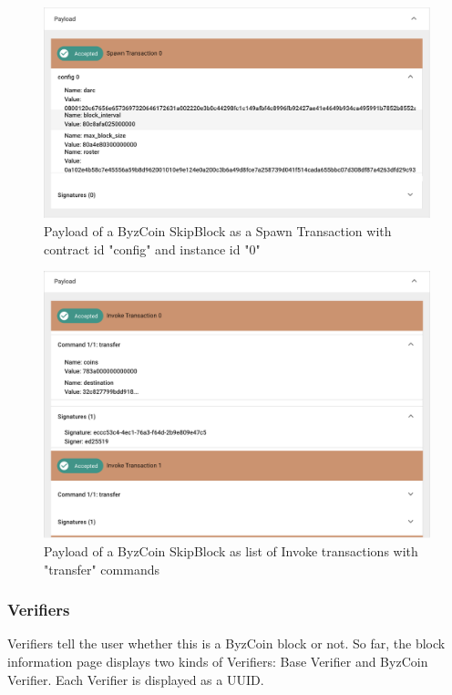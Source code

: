 \documentclass[11pt, a4paper, twoside, openright]{article} %
\begin{document}
{\begin{figure}[h]
    \centering
    \includegraphics[width=\textwidth]{spanw.png}
    \caption{Payload of a ByzCoin SkipBlock as a Spawn Transaction with contract id "config" and instance id "0"}
    \label{fig:Figure6}
\end{figure}
\begin{figure}[h]
    \centering
    \includegraphics[width=\textwidth]{Transactions.png}
    \caption{Payload of a ByzCoin SkipBlock as list of Invoke transactions with "transfer" commands}
    \label{fig:Figure7}
\end{figure}
\newpage
\subsubsection{Verifiers}
Verifiers tell the user whether this is a ByzCoin block or not. So far, the block information page displays two kinds of Verifiers: Base Verifier and ByzCoin Verifier. Each Verifier is displayed as a UUID.

}
\end{document}
